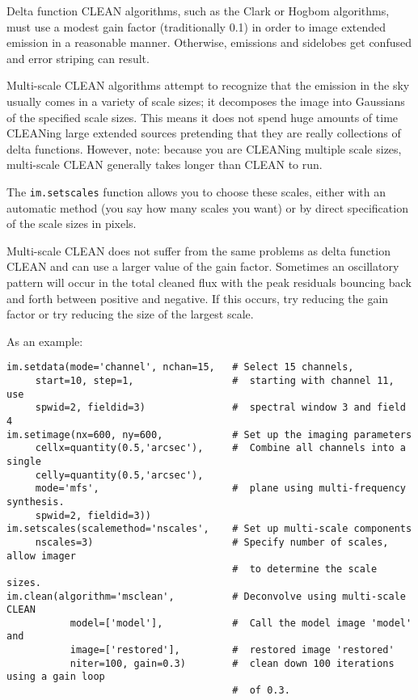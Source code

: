 \vspace{3mm}
Delta function CLEAN algorithms, such as the Clark or Hogbom
algorithms, must use a modest gain factor (traditionally 0.1) in order
to image extended emission in a reasonable manner.  Otherwise,
emissions and sidelobes get confused and error striping can result.

Multi-scale CLEAN algorithms attempt to recognize that the emission in
the sky usually comes in a variety of scale sizes; it decomposes the
image into Gaussians of the specified scale sizes.  This means it does
not spend huge amounts of time CLEANing large extended sources
pretending that they are really collections of delta functions.
However, note: because you are CLEANing multiple scale sizes,
multi-scale CLEAN generally takes longer than CLEAN to run.

The {\tt im.setscales} function allows you to choose these scales,
either with an automatic method (you say how many scales you want) or
by direct specification of the scale sizes in pixels.

Multi-scale CLEAN does not suffer from the same problems as delta
function CLEAN and can use a larger value of the gain factor.
Sometimes an oscillatory pattern will occur in the total cleaned flux
with the peak residuals bouncing back and forth between positive and
negative.  If this occurs, try reducing the gain factor or try
reducing the size of the largest scale.

As an example:

\small
\begin{verbatim}
im.setdata(mode='channel', nchan=15,   # Select 15 channels,
     start=10, step=1,                 #  starting with channel 11, use
     spwid=2, fieldid=3)               #  spectral window 3 and field 4
im.setimage(nx=600, ny=600,            # Set up the imaging parameters
     cellx=quantity(0.5,'arcsec'),     #  Combine all channels into a single
     celly=quantity(0.5,'arcsec'),
     mode='mfs',                       #  plane using multi-frequency synthesis.
     spwid=2, fieldid=3))
im.setscales(scalemethod='nscales',    # Set up multi-scale components
     nscales=3)                        # Specify number of scales, allow imager
                                       #  to determine the scale sizes.
im.clean(algorithm='msclean',          # Deconvolve using multi-scale CLEAN
           model=['model'],            #  Call the model image 'model' and
           image=['restored'],         #  restored image 'restored'
           niter=100, gain=0.3)        #  clean down 100 iterations using a gain loop
                                       #  of 0.3.
\end{verbatim}
\normalsize

